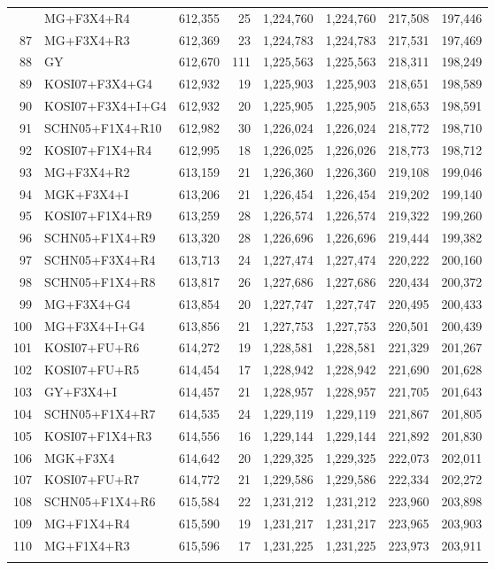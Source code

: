 \begin{longtable}{rlrrrrrr}
{86&MG+F3X4+R4&612,355&25&1,224,760&1,224,760&217,508&197,446\\
87&MG+F3X4+R3&612,369&23&1,224,783&1,224,783&217,531&197,469\\
88&GY&612,670&111&1,225,563&1,225,563&218,311&198,249\\
89&KOSI07+F3X4+G4&612,932&19&1,225,903&1,225,903&218,651&198,589\\
90&KOSI07+F3X4+I+G4&612,932&20&1,225,905&1,225,905&218,653&198,591\\
91&SCHN05+F1X4+R10&612,982&30&1,226,024&1,226,024&218,772&198,710\\
92&KOSI07+F1X4+R4&612,995&18&1,226,025&1,226,026&218,773&198,712\\
93&MG+F3X4+R2&613,159&21&1,226,360&1,226,360&219,108&199,046\\
94&MGK+F3X4+I&613,206&21&1,226,454&1,226,454&219,202&199,140\\
95&KOSI07+F1X4+R9&613,259&28&1,226,574&1,226,574&219,322&199,260\\
96&SCHN05+F1X4+R9&613,320&28&1,226,696&1,226,696&219,444&199,382\\
97&SCHN05+F3X4+R4&613,713&24&1,227,474&1,227,474&220,222&200,160\\
98&SCHN05+F1X4+R8&613,817&26&1,227,686&1,227,686&220,434&200,372\\
99&MG+F3X4+G4&613,854&20&1,227,747&1,227,747&220,495&200,433\\
100&MG+F3X4+I+G4&613,856&21&1,227,753&1,227,753&220,501&200,439\\
101&KOSI07+FU+R6&614,272&19&1,228,581&1,228,581&221,329&201,267\\
102&KOSI07+FU+R5&614,454&17&1,228,942&1,228,942&221,690&201,628\\
103&GY+F3X4+I&614,457&21&1,228,957&1,228,957&221,705&201,643\\
104&SCHN05+F1X4+R7&614,535&24&1,229,119&1,229,119&221,867&201,805\\
105&KOSI07+F1X4+R3&614,556&16&1,229,144&1,229,144&221,892&201,830\\
106&MGK+F3X4&614,642&20&1,229,325&1,229,325&222,073&202,011\\
107&KOSI07+FU+R7&614,772&21&1,229,586&1,229,586&222,334&202,272\\
108&SCHN05+F1X4+R6&615,584&22&1,231,212&1,231,212&223,960&203,898\\
109&MG+F1X4+R4&615,590&19&1,231,217&1,231,217&223,965&203,903\\
110&MG+F1X4+R3&615,596&17&1,231,225&1,231,225&223,973&203,911\\
}
\end{longtable}
